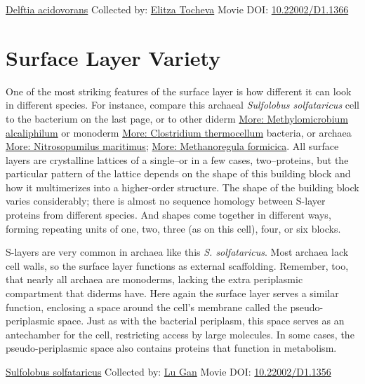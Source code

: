 \documentclass[]{tufte-book}
\begin{document}
\hypertarget{htmlwidget-de288e0723b4f76bfac2}{}

\label{fig:2-6a}\protect\hyperlink{tree}{Delftia acidovorans} Collected by: \protect\hyperlink{elitza_tocheva}{Elitza Tocheva} Movie DOI: \href{https://doi.org/10.22002/D1.1366}{10.22002/D1.1366}

\hypertarget{surface-layer-variety}{%
\section{Surface Layer Variety}\label{surface-layer-variety}}

One of the most striking features of the surface layer is how different it can look in different species. For instance, compare this archaeal \emph{Sulfolobus solfataricus} cell to the bacterium on the last page, or to other diderm \protect\hyperlink{Methylomicrobium_alcaliphilum}{More: Methylomicrobium alcaliphilum} or monoderm \protect\hyperlink{Clostridium_thermocellum}{More: Clostridium thermocellum} bacteria, or archaea \protect\hyperlink{Nitrosopumilus_maritimus}{More: Nitrosopumilus maritimus}; \protect\hyperlink{Methanoregula_formicica}{More: Methanoregula formicica}. All surface layers are crystalline lattices of a single--or in a few cases, two--proteins, but the particular pattern of the lattice depends on the shape of this building block and how it multimerizes into a higher-order structure. The shape of the building block varies considerably; there is almost no sequence homology between S-layer proteins from different species. And shapes come together in different ways, forming repeating units of one, two, three (as on this cell), four, or six blocks.

S-layers are very common in archaea like this \emph{S. solfataricus}. Most archaea lack cell walls, so the surface layer functions as external scaffolding. Remember, too, that nearly all archaea are monoderms, lacking the extra periplasmic compartment that diderms have. Here again the surface layer serves a similar function, enclosing a space around the cell's membrane called the pseudo-periplasmic space. Just as with the bacterial periplasm, this space serves as an antechamber for the cell, restricting access by large molecules. In some cases, the pseudo-periplasmic space also contains proteins that function in metabolism.



\hypertarget{htmlwidget-01ef3a569936b9f3289f}{}

\label{fig:2-7}\protect\hyperlink{tree}{Sulfolobus solfataricus} Collected by: \protect\hyperlink{lu_gan}{Lu Gan} Movie DOI: \href{https://doi.org/10.22002/D1.1356}{10.22002/D1.1356}
\end{document}
